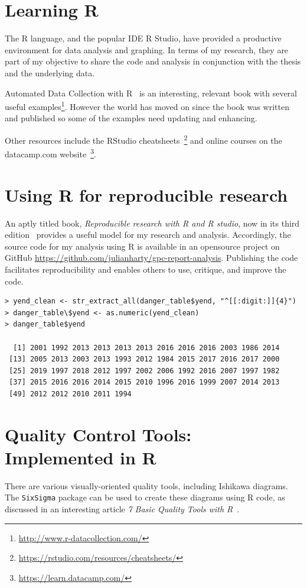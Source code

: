 \section{Learning R}

The R language, and the popular IDE R Studio, have provided a productive environment for data analysis and graphing. In terms of my research, they are part of my objective to share the code and analysis in conjunction with the thesis and the underlying data.

Automated Data Collection with R~\cite{munzert2014automated} is an interesting, relevant book with several useful examples\footnote{\url{http://www.r-datacollection.com/}}. However the world has moved on since the book was written and published so some of the examples need updating and enhancing.

Other resources include the RStudio cheatsheets~\footnote{\url{https://rstudio.com/resources/cheatsheets/}} and online courses on the datacamp.com website~\footnote{\url{https://learn.datacamp.com/}}.

\section{Using R for reproducible research}
An aptly titled book, \emph{Reproducible research with R and R studio}, now in its third edition~\cite{gandrud2020reproducible} provides a useful model for my research and analysis. Accordingly, the source code for my analysis using R is available in an opensource project on GitHub \url{https://github.com/julianharty/gpc-report-analysis}. Publishing the code facilitates reproducibility and enables others to use, critique, and improve the code.

\begin{lstlisting}[caption=Parsing dates from Wikipedia content,label=listing:parse_dates]
> yend_clean <- str_extract_all(danger_table$yend, "^[[:digit:]]{4}")
> danger_table\$yend <- as.numeric(yend_clean)
> danger_table$yend

  [1] 2001 1992 2013 2013 2013 2013 2016 2016 2016 2003 1986 2014
 [13] 2005 2013 2003 2013 1993 2012 1984 2015 2017 2016 2017 2000 
 [25] 2019 1997 2018 2012 1997 2002 2006 1992 2016 2007 1997 1982
 [37] 2015 2016 2016 2014 2015 2010 1996 2016 1999 2007 2014 2013
 [49] 2012 2012 2010 2011 1994
\end{lstlisting}

\section{Quality Control Tools: Implemented in R}
There are various visually-oriented quality tools, including Ishikawa diagrams. The \texttt{SixSigma} package can be used to create these diagrams using R code, as discussed in an interesting article \emph{7 Basic Quality Tools with R}~\cite{7_basic_quality_tools_with_R}.


